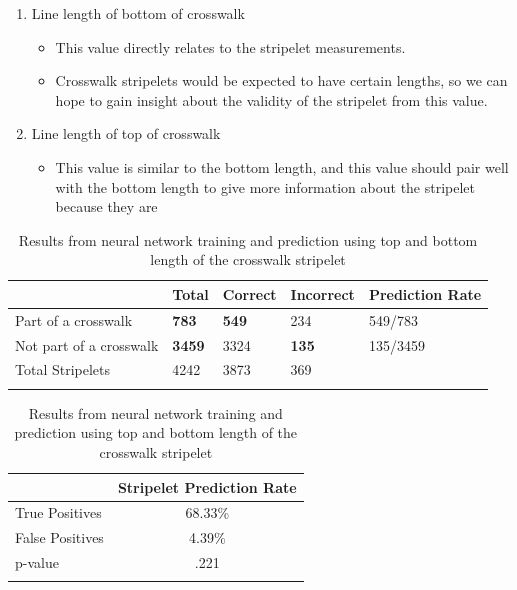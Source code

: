 \documentclass[12pt]{ucthesis}
\begin{document}
\begin{enumerate}
   \item Line length of bottom of crosswalk
   \begin{itemize}
     \item This value directly relates to the stripelet measurements.
     \item Crosswalk stripelets would be expected to have certain lengths, so we can hope to gain insight about the validity of the stripelet from this value.
   \end{itemize}
   \item Line length of top of crosswalk
   \begin{itemize}
     \item This value is similar to the bottom length, and this value should pair well with the bottom length to give more information about the stripelet because they are 
   \end{itemize}
\end{enumerate}

\begin{center}
    \begin{longtable}{| l | l | l | l | l |}
    \hline
     & Total & Correct & Incorrect & Prediction Rate \\ \hline
    Part of a crosswalk & \textbf{783} & \textbf{549} & 234 & 549/783 \\ \hline
    Not part of a crosswalk & \textbf{3459} & 3324 & \textbf{135} & 135/3459\\ \hline
    Total Stripelets & 4242 & 3873 & 369 & \\ \hline
    
    \caption{Results from neural network training and prediction using top and bottom length of the crosswalk stripelet}
    \label{tab:Results1-1} 
    \end{longtable}
\end{center}


\begin{longtable}{| l | c |}
  \hline
   & Stripelet Prediction Rate \\ \hline                   
  True Positives & 68.33\%  \\ \hline
  False Positives & 4.39\% \\ \hline
  p-value & .221  \\ \hline

\caption{Results from neural network training and prediction using top and bottom length of the crosswalk stripelet}
\label{tab:Results1-2} 
\end{longtable}
\end{document}
